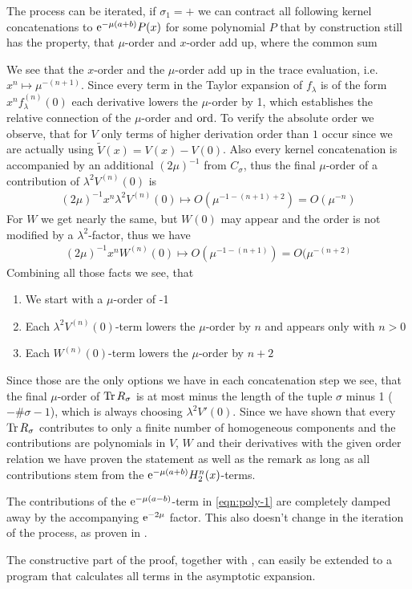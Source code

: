 \begin{MainTheorem}
\begin{Proof}
    The process can be iterated, if $\sigma_1 = +$ we can contract all following
    kernel concatenations to $\mathrm e^{-\mu(a+b)} P(x)$ for some polynomial $P$ that
    by construction still has the property, that $\mu$-order and $x$-order add
    up, where the common sum 

    We see that the $x$-order and the $\mu$-order add up in the trace
    evaluation, i.e.\ $x^n \mapsto \mu^{-(n+1)}$. Since every term in the Taylor
    expansion of $f_\lambda$ is of the form $x^n f^{(n)}_\lambda(0)$ each
    derivative lowers the $\mu$-order by 1, which establishes the relative
    connection of the $\mu$-order and $\operatorname{ord}$. To verify the absolute order we
    observe, that for $V$ only terms of higher derivation order than $1$ occur
    since we are actually using $\tilde V(x) = V(x) - V(0)$. Also every kernel
    concatenation is accompanied by an additional $(2\mu)^{-1}$ from $C_\sigma$,
    thus the final $\mu$-order of a contribution of $\lambda^2 V^{(n)}(0)$ is
    \begin{align*}
      (2\mu)^{-1} x^n \lambda^2 V^{(n)}(0) \mapsto O(\mu^{-1-(n+1)+2}) =
      O(\mu^{-n})
    \end{align*}
    For $W$ we get nearly the same, but $W(0)$ may appear and the order is not
    modified by a $\lambda^2$-factor, thus we have
    \begin{align*}
      (2\mu)^{-1} x^n W^{(n)}(0) \mapsto O(\mu^{-1-(n+1)}) = O(\mu^{-(n+2)}
    \end{align*}
    Combining all those facts we see, that 
    \begin{enumerate}
      \item We start with a $\mu$-order of -1
      \item Each $\lambda^2 V^{(n)}(0)$-term lowers the $\mu$-order by $n$ and
        appears only with $n > 0$
      \item Each $W^{(n)}(0)$-term lowers the $\mu$-order by $n+2$
    \end{enumerate}
    Since those are the only options we have in each concatenation step we see,
    that the final $\mu$-order of $\operatorname{Tr} R_\sigma$ is at most minus the length of
    the tuple $\sigma$ minus 1 ($-\#{\sigma}-1$), which is always choosing
    $\lambda^2 V'(0)$. Since we have shown that every $\operatorname{Tr} R_\sigma$ contributes
    to only a finite number of homogeneous components and the contributions are
    polynomials in $V$, $W$ and their derivatives with the given order relation
    we have proven the statement as well as the remark as long as all
    contributions stem from the $\mathrm e^{-\mu(a+b)}H^n_2(x)$-terms.

    The contributions of the $\mathrm e^{-\mu(a-b)}$-term in \cref{eqn:poly-1} are
    completely damped away by the accompanying $\mathrm e^{-2\mu}$ factor. This also
    doesn't change in the iteration of the process, as proven in
    .
  \end{Proof}
\end{MainTheorem}
The constructive part of the proof, together with , can
easily be extended to a program that calculates all terms in the asymptotic
expansion.
